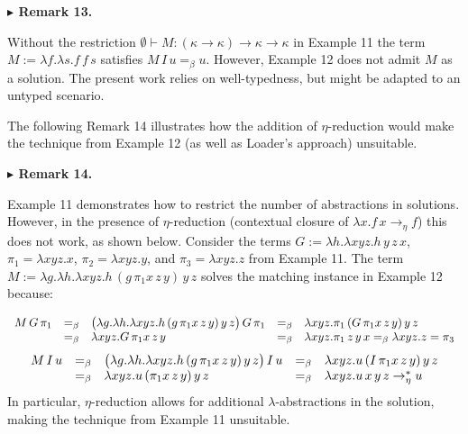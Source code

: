  
\par\medskip\noindent\textbf{$\blacktriangleright$ Remark 13.}\par
 
 
Without the restriction $\emptyset\vdash M:(\kappa\to\kappa)\to\kappa\to\kappa$ in Example 11 the term $M:=\lambda f.\lambda s.f\,f\,s$ satisfies $M\,I\,u=_{\beta}u$. However, Example 12 does not admit $M$ as a solution. The present work relies on well-typedness, but might be adapted to an untyped scenario.\par
 
 
 
 
The following Remark 14 illustrates how the addition of $\eta$-reduction would make the technique from Example 12 (as well as Loader’s approach) unsuitable.\par
 
 
 
\par\medskip\noindent\textbf{$\blacktriangleright$ Remark 14.}\par
 
 
Example 11 demonstrates how to restrict the number of abstractions in solutions. However, in the presence of $\eta$-reduction (contextual closure of $\lambda x.f\,x\to_{\eta}f$) this does not work, as shown below. Consider the terms $G:=\lambda h.\lambda xyz.h\,y\,z\,x$, $\pi_{1}=\lambda xyz.x$, $\pi_{2}=\lambda xyz.y$, and $\pi_{3}=\lambda xyz.z$ from Example 11. The term $M:=\lambda g.\lambda h.\lambda xyz.h\,(g\,\pi_{1}x\,z\,y)\,y\,z$ solves the matching instance in Example 12 because:\par
    \[\begin{array}[t]{lclcl}M\,G\,\pi_{1}&=_{\beta}&\big{(}\lambda g.\lambda h.%
\lambda xyz.h\,(g\,\pi_{1}x\,z\,y)\,y\,z\big{)}\,G\,\pi_{1}&=_{\beta}&\lambda
xyz%
.\pi_{1}\,(G\,\pi_{1}x\,z\,y)\,y\,z\\
&=_{\beta}&\lambda xyz.G\,\pi_{1}x\,z\,y&=_{\beta}&\lambda xyz.\pi_{1}\,z\,y\,%
x=_{\beta}\lambda xyz.z=\pi_{3}\end{array}\]       \[\begin{array}[t]{lclcl}M\,I\,u&=_{\beta}&\big{(}\lambda g.\lambda h.\lambda xyz%
.h\,(g\,\pi_{1}x\,z\,y)\,y\,z\big{)}\,I\,u&=_{\beta}&\lambda xyz.u\,(I\,\pi_{1%
}x\,z\,y)\,y\,z\\
&=_{\beta}&\lambda xyz.u\,(\pi_{1}x\,z\,y)\,y\,z&=_{\beta}&\lambda xyz.u\,x\,y%
\,z\to_{\eta}^{*}u\end{array}\]    
In particular, $\eta$-reduction allows for additional $\lambda$-abstractions in the solution, making the technique from Example 11 unsuitable.\par
 
